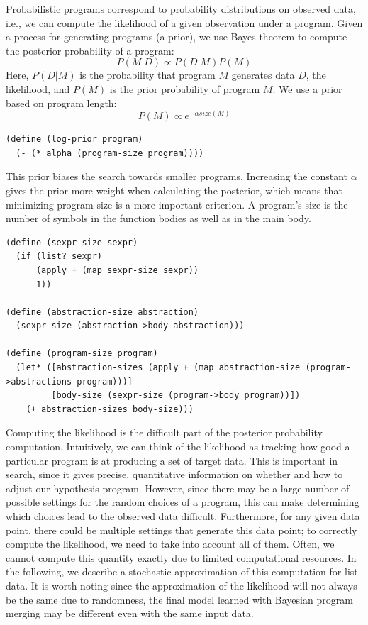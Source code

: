 \documentclass[a4paper,10pt]{article}
\begin{document}
Probabilistic programs correspond to probability distributions on observed data, i.e., we can compute the likelihood of a given observation under a program. Given a process for generating programs (a prior), we use Bayes theorem to compute the posterior probability of a program:
\begin{equation}P(M|D)\propto P(D|M)P(M)\end{equation}
Here, $P(D|M)$ is the probability that program $M$ generates data $D$, the likelihood, and $P(M)$ is the prior probability of program $M$. We use a prior based on program length:
\begin{equation}P(M)\propto e^{-\alpha \mathit{size}(M)}\end{equation}
\begin{lstlisting}[frame=trbl]
(define (log-prior program)
  (- (* alpha (program-size program))))
\end{lstlisting}
This prior biases the search towards smaller programs. Increasing the constant $\alpha$ gives the prior more weight when calculating the posterior, which means that minimizing program size is a more important criterion. A program's size is the number of symbols in the function bodies as well as in the main body.
\begin{lstlisting}[frame=trbl]
(define (sexpr-size sexpr)
  (if (list? sexpr)
      (apply + (map sexpr-size sexpr))
      1))

(define (abstraction-size abstraction)
  (sexpr-size (abstraction->body abstraction)))
  
(define (program-size program)
  (let* ([abstraction-sizes (apply + (map abstraction-size (program->abstractions program)))]
         [body-size (sexpr-size (program->body program))])
    (+ abstraction-sizes body-size)))
\end{lstlisting}
Computing the likelihood is the difficult part of the posterior probability computation. Intuitively, we can think of the likelihood as tracking how good a particular program is at producing a set of target data.  This is important in search, since it gives precise, quantitative information on whether and how to adjust our hypothesis program. However, since there may be a large number of possible settings for the random choices of a program, this can make determining which choices lead to the observed data difficult. Furthermore, for any given data point, there could be multiple settings that generate this data point; to correctly compute the likelihood, we need to take into account all of them. Often, we cannot compute this quantity exactly due to limited computational resources.  In the following, we describe a stochastic approximation of this computation for list data.  It is worth noting since the approximation of the likelihood will not always be the same due to randomness, the final model learned with Bayesian program merging may be different even with the same input data.
\end{document}
